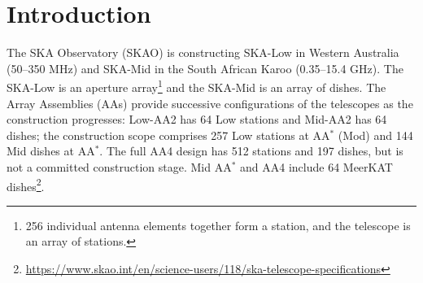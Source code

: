 \documentclass[11pt,twoside]{article}
\begin{document}
\begin{abstract}
The SKA Science Data Processor (SDP) must turn large visibility datasets
into scientifically validated images within finite computing and storage
resources. We describe the operational context, processing scale and
emerging batch-workflow design. Using illustrative data volumes and image
dimensions, we show why memory use and data movement matter alongside compute.
Modular scientific stages, explicit interfaces and Measurement Set version
4 (MSv4) are chosen to support evolving calibration and imaging methods. Reproducible
configuration, provenance and recoverable execution connect this design
to delivery from commissioning through science operations. We identify
validation priorities for scientific correctness, restart behaviour and
throughput; these are design objectives that the team is working to achieve.
\end{abstract}



\section{Introduction}
The SKA Observatory (SKAO) is constructing SKA-Low in
Western Australia (50--350 MHz) and SKA-Mid in the South African Karoo
(0.35--15.4 GHz). The SKA-Low is an aperture array\footnote{256 individual antenna elements together form a station, and the telescope is an array of stations.} and the SKA-Mid is an array of dishes.
The Array Assemblies (AAs) provide successive configurations of the telescopes as the construction progresses:
Low-AA2 has 64 Low stations and Mid-AA2 has 64 dishes; the construction scope comprises
257 Low stations at AA$^*$ (Mod) and 144 Mid dishes at AA$^*$. The full
AA4 design has 512 stations and 197 dishes, but is not a committed
construction stage. Mid AA$^*$ and AA4 include 64 MeerKAT
dishes\footnote{\raggedright\url{https://www.skao.int/en/science-users/118/ska-telescope-specifications}}.
\end{document}
